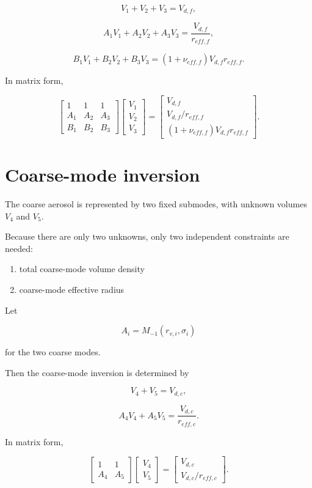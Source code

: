 \documentclass[
  letterpaper,
]{scrbook}
\providecommand{\tightlist}{%
  \setlength{\itemsep}{0pt}\setlength{\parskip}{0pt}}
\begin{document}
\[
V_1 + V_2 + V_3 = V_{d,f},
\]

\[
A_1V_1 + A_2V_2 + A_3V_3 = \frac{V_{d,f}}{r_{eff,f}},
\]

\[
B_1V_1 + B_2V_2 + B_3V_3 = (1+\nu_{eff,f})V_{d,f}r_{eff,f}.
\]

In matrix form,

\[
\begin{bmatrix}
1 & 1 & 1 \\
A_1 & A_2 & A_3 \\
B_1 & B_2 & B_3
\end{bmatrix}
\begin{bmatrix}
V_1 \\ V_2 \\ V_3
\end{bmatrix}
=
\begin{bmatrix}
V_{d,f} \\
V_{d,f}/r_{eff,f} \\
(1+\nu_{eff,f})V_{d,f}r_{eff,f}
\end{bmatrix}.
\]

\section{Coarse-mode inversion}\label{coarse-mode-inversion}

The coarse aerosol is represented by two fixed submodes, with unknown
volumes \(V_4\) and \(V_5\).

Because there are only two unknowns, only two independent constraints
are needed:

\begin{enumerate}
\def\labelenumi{\arabic{enumi}.}
\tightlist
\item
  total coarse-mode volume density
\item
  coarse-mode effective radius
\end{enumerate}

Let

\[
A_i = M_{-1}(r_{v,i},\sigma_i)
\]

for the two coarse modes.

Then the coarse-mode inversion is determined by

\[
V_4 + V_5 = V_{d,c},
\]

\[
A_4V_4 + A_5V_5 = \frac{V_{d,c}}{r_{eff,c}}.
\]

In matrix form,

\[
\begin{bmatrix}
1 & 1 \\
A_4 & A_5
\end{bmatrix}
\begin{bmatrix}
V_4 \\ V_5
\end{bmatrix}
=
\begin{bmatrix}
V_{d,c} \\
V_{d,c}/r_{eff,c}
\end{bmatrix}.
\]
\end{document}
